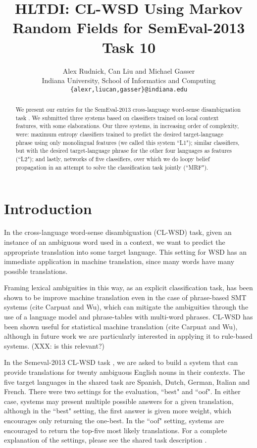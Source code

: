 \documentclass[11pt,letterpaper]{article}
\title{HLTDI: CL-WSD Using Markov Random Fields for SemEval-2013 Task 10}
\author{Alex Rudnick, Can Liu and Michael Gasser\\
	    Indiana University, School of Informatics and Computing \\
	    {\tt \{alexr,liucan,gasser\}@indiana.edu}}
\date{}
\begin{document}
\maketitle

\begin{abstract}


We present our entries for the SemEval-2013 cross-language word-sense
disambiguation task \cite{task10}. We submitted three systems based
on classifiers trained on local context features, with some elaborations.
Our three systems, in increasing order of complexity, were: maximum entropy
classifiers trained to predict the desired target-language phrase using only monolingual features (we called this system ``L1"); similar classifiers, but with the desired target-language
phrase for the other four languages as features (``L2"); and lastly, networks
of five classifiers, over which we do loopy belief propagation in an attempt to
solve the classification task jointly (``MRF").
\end{abstract}

\section{Introduction}
In the cross-language word-sense disambiguation (CL-WSD) task, given an
instance of an ambiguous word used in a context, we want to predict the
appropriate translation into some target language. This setting for WSD has an
immediate application in machine translation, since many words have many
possible translations.

Framing lexical ambiguities in this way, as an explicit classification task,
has been shown to be improve machine translation even in the case of
phrase-based SMT systems (cite Carpuat and Wu), which can mitigate the
ambiguities through the use of a language model and phrase-tables with
multi-word phrases.
CL-WSD has been shown useful for statistical machine translation (cite Carpuat and Wu), although in future work we are particularly interested in applying it to rule-based systems. (XXX: is this relevant?)

In the Semeval-2013 CL-WSD task \cite{task10}, we are asked to build a system that can provide
translations for twenty ambiguous English nouns in their contexts. The five target languages in the shared task are Spanish, Dutch, German, Italian and French. There were two settings for the evaluation, ``best" and ``oof". In either case, systems may present multiple possible answers for a given translation, although in the ``best" setting, the first answer is given more weight, which encourages only returning the one-best. In the ``oof" setting, systems are encouraged to return the top-five most likely translations. For a complete explanation of the settings, please see the shared task description \cite{task10}.
\end{document}
